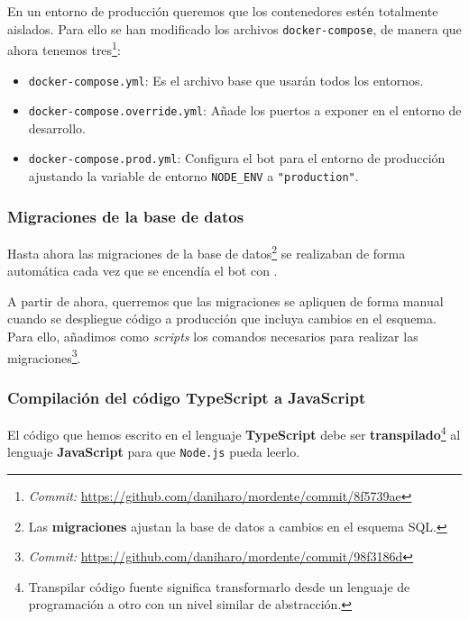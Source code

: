 En un entorno de producción queremos que los contenedores estén totalmente aislados. Para ello se han modificado los archivos \texttt{docker-compose}, de manera que ahora tenemos tres\footnote{\textit{Commit:} \url{https://github.com/daniharo/mordente/commit/8f5739ae}}:

\begin{itemize}
    \item \texttt{docker-compose.yml}: Es el archivo base que usarán todos los entornos.
    \item \texttt{docker-compose.override.yml}: Añade los puertos a exponer en el entorno de desarrollo.
    \item \texttt{docker-compose.prod.yml}: Configura el bot para el entorno de producción ajustando la variable de entorno \texttt{NODE\_ENV} a \texttt{"production"}.
\end{itemize}


\subsubsection{Migraciones de la base de datos}

Hasta ahora las migraciones de la base de datos\footnote{Las \textbf{migraciones} ajustan la base de datos a cambios en el esquema SQL.} se realizaban de forma automática cada vez que se encendía el bot con .

A partir de ahora, querremos que las migraciones se apliquen de forma manual cuando se despliegue código a producción que incluya cambios en el esquema. Para ello, añadimos como \textit{scripts} los comandos necesarios para realizar las migraciones\footnote{\textit{Commit:} \url{https://github.com/daniharo/mordente/commit/98f3186d}}.


\subsubsection{Compilación del código TypeScript a JavaScript}

El código que hemos escrito en el lenguaje \textbf{TypeScript} debe ser \textbf{transpilado}\footnote{Transpilar código fuente significa transformarlo desde un lenguaje de programación a otro con un nivel similar de abstracción\cite{whatIsTranspiler}.} al lenguaje \textbf{JavaScript} para que \texttt{Node.js} pueda leerlo.

